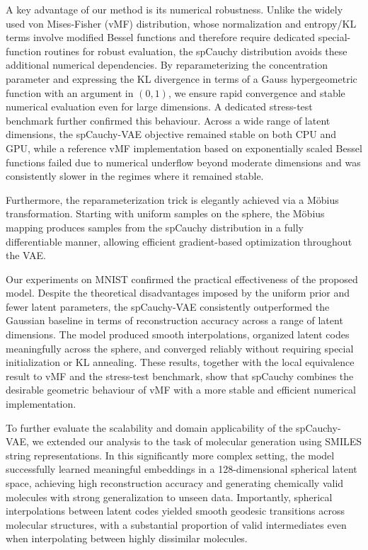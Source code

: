 \documentclass{article}
\begin{document}
A key advantage of our method is its numerical robustness. Unlike the widely used von Mises-Fisher (vMF) distribution, whose normalization and entropy/KL terms involve modified Bessel functions and therefore require dedicated special-function routines for robust evaluation, the spCauchy distribution avoids these additional numerical dependencies. By reparameterizing the concentration parameter and expressing the KL divergence in terms of a Gauss hypergeometric function with an argument in \((0,1)\), we ensure rapid convergence and stable numerical evaluation even for large dimensions. A dedicated stress-test benchmark further confirmed this behaviour. Across a wide range of latent dimensions, the spCauchy-VAE objective remained stable on both CPU and GPU, while a reference vMF implementation based on exponentially scaled Bessel functions failed due to numerical underflow beyond moderate dimensions and was consistently slower in the regimes where it remained stable.

Furthermore, the reparameterization trick is elegantly achieved via a Möbius transformation. Starting with uniform samples on the sphere, the Möbius mapping produces samples from the spCauchy distribution in a fully differentiable manner, allowing efficient gradient-based optimization throughout the VAE.

Our experiments on MNIST confirmed the practical effectiveness of the proposed model. Despite the theoretical disadvantages imposed by the uniform prior and fewer latent parameters, the spCauchy-VAE consistently outperformed the Gaussian baseline in terms of reconstruction accuracy across a range of latent dimensions. The model produced smooth interpolations, organized latent codes meaningfully across the sphere, and converged reliably without requiring special initialization or KL annealing. These results, together with the local equivalence result to vMF and the stress-test benchmark, show that spCauchy combines the desirable geometric behaviour of vMF with a more stable and efficient numerical implementation.

To further evaluate the scalability and domain applicability of the spCauchy-VAE, we extended our analysis to the task of molecular generation using SMILES string representations. In this significantly more complex setting, the model successfully learned meaningful embeddings in a 128-dimensional spherical latent space, achieving high reconstruction accuracy and generating chemically valid molecules with strong generalization to unseen data. Importantly, spherical interpolations between latent codes yielded smooth geodesic transitions across molecular structures, with a substantial proportion of valid intermediates even when interpolating between highly dissimilar molecules. 
\end{document}
